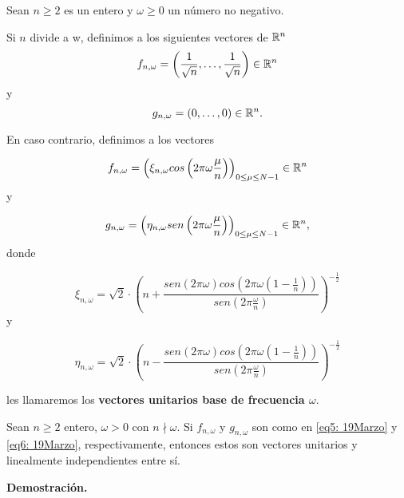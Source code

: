 \begin{defi}
Sean $n \geq 2$ es un entero y $\omega \geq 0$ un número no negativo.

Si $n$ divide a w, definimos a los siguientes vectores de $\mathbb{R}^{n}$
\begin{equation}
\label{eq0: 27Marzo23}
f_{n, \omega} = \left( 
\frac{1}{\sqrt{n}}, \ldots , \frac{1}{\sqrt{n}}
\right) \in  \mathbb{R}^{n}
\end{equation}
y
\begin{equation}
\label{eq1: 27Marzo23}
g_{n, \omega} = \left( 
0,  \ldots , 0
\right) \in \mathbb{R}^{n}.
\end{equation}

En caso contrario, definimos a los vectores

	\begin{equation}
	\label{eq5: 19Marzo}
	f_{n, \omega}= \left( \xi_{n, \omega} cos \left(2 \pi \omega \frac{\mu }{n} \right) \right)_{0 \leq \mu \leq N-1}
	\in \mathbb{R}^{n}
	\end{equation}
y 

	\begin{equation}
	\label{eq6: 19Marzo}
	g_{n, \omega}= \left( \eta_{n, \omega} sen \left(2 \pi \omega \frac{\mu }{n}\right) \right)_{0 \leq \mu \leq N-1}
	\in \mathbb{R}^{n},
	\end{equation}
donde

\begin{equation}
\label{eq7: 19Marzo}
	\xi_{n, \omega}= 
	\sqrt{2} \cdot \left( n + \frac{sen(2 \pi \omega)
	cos(2 \pi \omega \left( 1- \frac{1}{n} \right))}{sen \left(2 \pi 
	\frac{\omega}{n} \right)} \right)^{-\frac{1}{2}} 
\end{equation}
y

	\begin{equation}
	\label{eq8: 19Marzo}
	\eta_{n, \omega}= \sqrt{2} \cdot \left( n - \frac{sen(2 \pi \omega)
	cos(2 \pi \omega \left( 1- \frac{1}{n} \right))}{sen \left(2 \pi 
	\frac{\omega}{n} \right)} \right)^{-\frac{1}{2}}
	\end{equation}

\noindent	
les llamaremos los \textbf{vectores unitarios base de frecuencia $\omega$}.
\end{defi}


\begin{obs}
\label{obs: f y g son l.i. y de norma uno}
Sean $n \geq 2$ entero, $\omega >0$ con $n \nmid \omega$.
Si $f_{n, \omega}$ y $g_{n, \omega}$ son como en 
\eqref{eq5: 19Marzo} y \eqref{eq6: 19Marzo}, respectivamente,
entonces estos son vectores unitarios y linealmente independientes entre sí.
\end{obs}
\noindent
\textbf{Demostración.}

